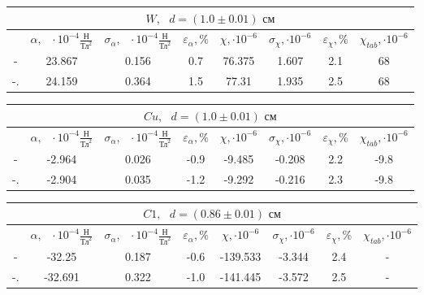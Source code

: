 \documentclass[a4paper,12pt]{article} %
\begin{document}
\begin{enumerate}
    \begin{table}[h]
	\centering
	\begin{tabular}{|c|c|c|c|c|c|c|c|}
		\hline
            \multicolumn{8}{|c|}{$W, \text{ } d = (1.0 \pm 0.01) \text{ см}$} \\ \hline
            \hline
		&$\alpha, \text{ }\cdot10^{-4}\frac{\text{Н}}{\text{Тл}^2}$ & $\sigma_{\alpha}, \text{ }\cdot10^{-4}\frac{\text{Н}}{\text{Тл}^2}$ & $\varepsilon_{\alpha}, \%$ & $\chi, \cdot10^{-6}$ & $\sigma_{\chi}, \cdot10^{-6}$ & $\varepsilon_{\chi}, \%$ & $\chi_{tab}, \cdot10^{-6}$ \\ \hline
        - & 23.867 & 0.156 & 0.7 & 76.375 & 1.607 & 2.1 & 68 \\ \hline
        -. & 24.159 & 0.364 & 1.5 & 77.31 & 1.935 & 2.5 & 68 \\ \hline
	\end{tabular}
        \begin{tabular}{|c|c|c|c|c|c|c|c|}
		\hline
            \multicolumn{8}{|c|}{$Cu, \text{ } d = (1.0 \pm 0.01) \text{ см}$} \\ \hline
            \hline
		&$\alpha, \text{ }\cdot10^{-4}\frac{\text{Н}}{\text{Тл}^2}$ & $\sigma_{\alpha}, \text{ }\cdot10^{-4}\frac{\text{Н}}{\text{Тл}^2}$ & $\varepsilon_{\alpha}, \%$ & $\chi, \cdot10^{-6}$ & $\sigma_{\chi}, \cdot10^{-6}$ & $\varepsilon_{\chi}, \%$ & $\chi_{tab}, \cdot10^{-6}$ \\ \hline
        - & -2.964 & 0.026 & -0.9 & -9.485 & -0.208 & 2.2 & -9.8 \\ \hline
        -. & -2.904 & 0.035 & -1.2 & -9.292 & -0.216 & 2.3 & -9.8 \\ \hline
        \end{tabular}
        \begin{tabular}{|c|c|c|c|c|c|c|c|}
		\hline
            \multicolumn{8}{|c|}{$C1, \text{ } d = (0.86 \pm 0.01) \text{ см}$} \\ \hline
            \hline
		&$\alpha, \text{ }\cdot10^{-4}\frac{\text{Н}}{\text{Тл}^2}$ & $\sigma_{\alpha}, \text{ }\cdot10^{-4}\frac{\text{Н}}{\text{Тл}^2}$ & $\varepsilon_{\alpha}, \%$ & $\chi, \cdot10^{-6}$ & $\sigma_{\chi}, \cdot10^{-6}$ & $\varepsilon_{\chi}, \%$ & $\chi_{tab}, \cdot10^{-6}$ \\ \hline
        - & -32.25 & 0.187 & -0.6 & -139.533 & -3.344 & 2.4 & - \\ \hline
        -. & -32.691 & 0.322 & -1.0 & -141.445 & -3.572 & 2.5 & - \\ \hline
	\end{tabular}

\end{table}
\end{enumerate}
\end{document}
